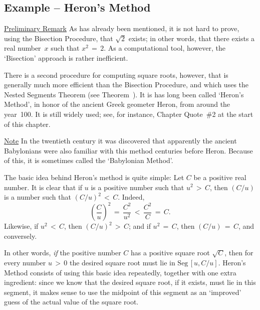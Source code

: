 \VV


            \subsection{\small{\bf Example} -- Heron's Method}
            \label{ExampC20.50A}

\V

        \underline{Preliminary Remark} As has already been mentioned, it is not hard to prove, using the Bisection Procedure, that $\sqrt{2}$ exists;
    in other words, that there exists a real number~$x$ such that $x^{2}\,=\,2$.
    As a computational tool, however, the `Bisection' approach is rather inefficient.

        There is a second procedure for computing square roots, however, that is generally much more efficient than the Bisection Procedure,
    and which uses the Nested Segments Theorem (see Theorem~).
    It is has long been called `Heron's Method', in honor of the ancient Greek geometer Heron, from around the year~100.
    It is still widely used; see, for instance, Chapter Quote~\#2 at the start of this chapter.

    \underline{Note} In the twentieth century it was discovered that apparently the ancient Babylonians
    were also familiar with this method centuries before Heron. Because of this,  it is sometimes called the `Babylonian Method'.

        The basic idea behind Heron's method is quite simple: Let $C$ be a positive real number.
    It is clear that if $u$ is a positive number such that $u^{2}\,>\,C$, then $(C/u)$ is a number such that $(C/u)^{2}\,<\,C$.
    Indeed,
        \begin{displaymath}
        \left(\frac{C}{u}\right)^{2} \,=\, \frac{C^{2}}{u^{2}}\,<\,\frac{C^{2}}{C} \,=\, C.
        \end{displaymath}
    Likewise, if $u^{2}\,<\,C$, then $(C/u)^{2}\,>\,C$; and if $u^{2} \,=\, C$, then $(C/u) \,=\, C$, and conversely.

        In other words, {\em if} the positive number $C$ has a positive square root $\sqrt{C}$,
    then for every number $u\,>\,0$ the desired square root must lie in $\mbox{Seg}\,[u,C/u]$.
    Heron's Method consists of using this basic idea repeatedly, together with one extra ingredient: since we know that the desired square root, if it exists, must lie in this segment, it makes sense to use the midpoint of this segment as an `improved' guess of the actual value of the square root.

